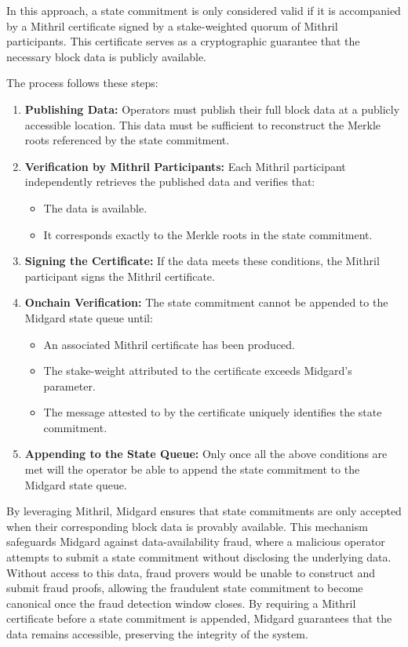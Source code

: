 \documentclass[../midgard.tex]{subfiles}
\begin{document}
In this approach, a state commitment is only considered valid if it is accompanied by a Mithril certificate signed by a stake-weighted quorum of Mithril participants. This certificate serves as a cryptographic guarantee that the necessary block data is publicly available.

The process follows these steps:
\begin{enumerate}
  \item \textbf{Publishing Data:} Operators must publish their full block data at a publicly accessible location. This data must be sufficient to reconstruct the Merkle roots referenced by the state commitment.
  \item \textbf{Verification by Mithril Participants:} Each Mithril participant independently retrieves the published data and verifies that:
  \begin{itemize}
    \item The data is available.
    \item It corresponds exactly to the Merkle roots in the state commitment.
  \end{itemize}
  \item \textbf{Signing the Certificate:} If the data meets these conditions, the Mithril participant signs the Mithril certificate.
  \item \textbf{Onchain Verification:} The state commitment cannot be appended to the Midgard state queue until:
  \begin{itemize}
    \item An associated Mithril certificate has been produced.
    \item The stake-weight attributed to the certificate exceeds Midgard's  parameter.
    \item The message attested to by the certificate uniquely identifies the state commitment.
  \end{itemize}
  \item \textbf{Appending to the State Queue:} Only once all the above conditions are met will the operator be able to append the state commitment to the Midgard state queue.
\end{enumerate}

By leveraging Mithril, Midgard ensures that state commitments are only accepted when their corresponding block data is provably available. This mechanism safeguards Midgard against data-availability fraud, where a malicious operator attempts to submit a state commitment without disclosing the underlying data. Without access to this data, fraud provers would be unable to construct and submit fraud proofs, allowing the fraudulent state commitment to become canonical once the fraud detection window closes. By requiring a Mithril certificate before a state commitment is appended, Midgard guarantees that the data remains accessible, preserving the integrity of the system.
\end{document}
